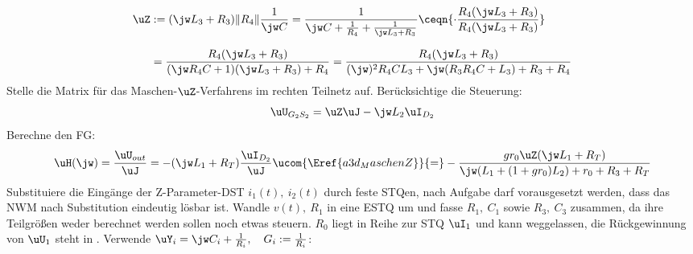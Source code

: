 \begin{align*}%
	\uZ&:=(\jw L_3+R_3)\|R_4\|\frac{1}{\jw C}=\frac{1}{%
		\jw C+\frac{1}{R_4}+\frac{1}{\jw L_3+R_3}%
	}\ceqn{%
		\cdot\frac{%
			R_4(\jw L_3+R_3)%
		}{%
			R_4(\jw L_3+R_3)%
		}%
	}\\[2.5mm]%
%
	&=\frac{%
		R_4(\jw L_3+R_3)%
	}{%
		(\jw R_4C+1)(\jw L_3+R_3)+R_4%
	}=\frac{%
		R_4(\jw L_3+R_3)%
	}{%
		(\jw)^2R_4CL_3+\jw(R_3R_4C+L_3)+R_3+R_4%
	}%
\end{align*}%
%
Stelle die Matrix für das Maschen-$\uZ$-Verfahrens im rechten Teilnetz auf. 
%
%
Berücksichtige die Steuerung:
\[%
	\uU_{G_2S_2}=\uZ\uJ-\jw L_2\uI_{D_2}%
\]%
%
Berechne den FG:
\[%
	\uH(\jw)=\frac{\uU_{out}}{\uJ}=-(\jw L_1+R_T)\frac{\uI_{D_2}}{\uJ}\ucom{%
		\Eref{a3d_MaschenZ}%
	}{=}-\frac{%
		gr_0\uZ(\jw L_1+R_T)%
	}{%
		\jw(L_1+(1+gr_0)L_2)+r_0+R_3+R_T%
	}%
\]%
%
%
%
Substituiere die Eingänge der Z-Parameter-DST $i_1(t),\:i_2(t)$ durch feste STQen, nach Aufgabe darf vorausgesetzt werden, dass das NWM nach Substitution eindeutig lösbar ist. Wandle $v(t),\: R_1$ in eine ESTQ um und fasse $R_1,\:C_1$ sowie $R_3,\:C_3$ zusammen, da ihre Teilgrößen weder berechnet werden sollen noch etwas steuern. $R_0$ liegt in Reihe zur STQ $\uI_1$ und kann weggelassen, die Rückgewinnung von $\uU_1$ steht in . Verwende $\uY_i=\jw C_i+\frac{1}{R_i},\quad G_i:=\frac{1}{R_i}$:
%

